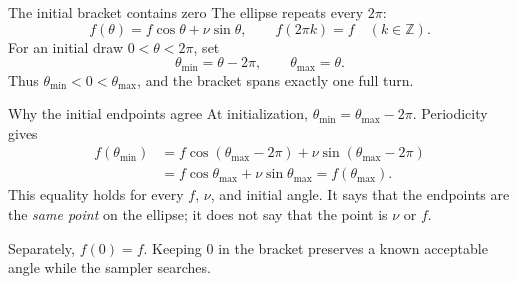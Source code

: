 \documentclass[aspectratio=169,11pt]{beamer}
\begin{document}
\begin{frame}{The initial bracket contains zero}
  The ellipse repeats every \(2\pi\):
  \[
    f(\theta)=f\cos\theta+\nu\sin\theta,
    \qquad f(2\pi k)=f\quad(k\in\mathbb Z).
  \]
  For an initial draw \(0<\theta<2\pi\), set
  \[
    \theta_{\min}=\theta-2\pi,
    \qquad
    \theta_{\max}=\theta.
  \]
  Thus \(\theta_{\min}<0<\theta_{\max}\), and the bracket
  spans exactly one full turn.
  \vspace{0.35em}
  \begin{center}
  \end{center}
\end{frame}

\begin{frame}{Why the initial endpoints agree}
  At initialization, \(\theta_{\min}=\theta_{\max}-2\pi\).
  Periodicity gives
  \[
    \begin{aligned}
      f(\theta_{\min})
        &=f\cos(\theta_{\max}-2\pi)
          +\nu\sin(\theta_{\max}-2\pi)\\
        &=f\cos\theta_{\max}+\nu\sin\theta_{\max}
         =f(\theta_{\max}).
    \end{aligned}
  \]
  This equality holds for every \(f\), \(\nu\), and initial angle.
  It says that the endpoints are the \emph{same point} on the ellipse;
  it does not say that the point is \(\nu\) or \(f\).
  \vspace{0.6em}

  Separately, \(f(0)=f\). Keeping \(0\) in the bracket preserves
  a known acceptable angle while the sampler searches.
\end{frame}
\end{document}
